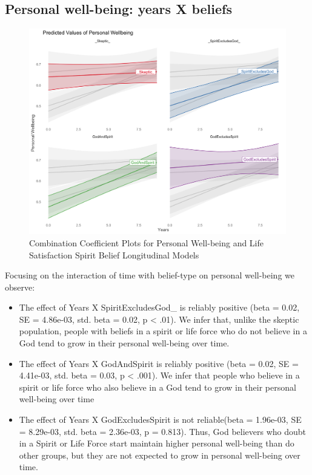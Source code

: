 \documentclass[
  english,
  man]{apa6}
\providecommand{\tightlist}{%
  \setlength{\itemsep}{0pt}\setlength{\parskip}{0pt}}
\begin{document}
\hypertarget{personal-well-being-years-x-beliefs}{%
\subsection{Personal well-being: years X beliefs}\label{personal-well-being-years-x-beliefs}}

\begin{figure}
\includegraphics[width=6.4in]{Figs/USEPWI_expected-1} \caption{Combination Coefficient Plots for Personal Well-being and Life Satisfaction Spirit Belief Longitudinal Models}\label{fig:unnamed-chunk-2}
\end{figure}

Focusing on the interaction of time with belief-type on personal well-being we observe:

\begin{itemize}
\tightlist
\item
  The effect of Years X SpiritExcludesGod\_ is reliably positive (beta = 0.02, SE = 4.86e-03, std. beta = 0.02, p \textless{} .01). We infer that, unlike the skeptic population, people with beliefs in a spirit or life force who do not believe in a God tend to grow in their personal well-being over time.
\item
  The effect of Years X GodAndSpirit is reliably positive (beta = 0.02, SE = 4.41e-03, std. beta = 0.03, p \textless{} .001). We infer that people who believe in a spirit or life force who also believe in a God tend to grow in their personal well-being over time
\item
  The effect of Years X GodExcludesSpirit is not reliable(beta = 1.96e-03, SE = 8.29e-03, std. beta = 2.36e-03, p = 0.813). Thus, God believers who doubt in a Spirit or Life Force start maintain higher personal well-being than do other groups, but they are not expected to grow in personal well-being over time.
\end{itemize}
\end{document}
